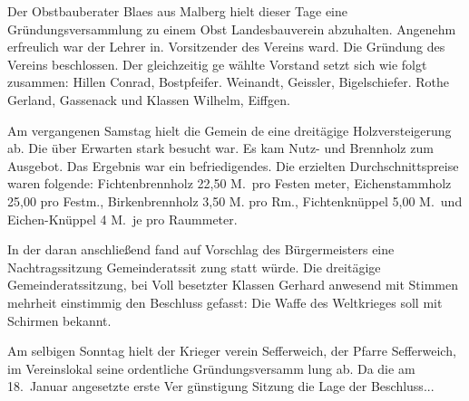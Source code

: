 

\pstart
{}%
Der Obstbauberater Blaes aus Malberg hielt dieser\ob
Tage eine Gründungsversammlung zu einem Obst\ohb
Landesbauverein abzuhalten. Angenehm erfreulich\ob
war der Lehrer\unsicher{} in. Vorsitzender des Vereins ward. Die\ob
Gründung des Vereins beschlossen. Der gleichzeitig ge\ohb
wählte Vorstand setzt sich wie folgt zusammen:\ob
Hillen Conrad, Bostpfeifer. Weinandt, Geissler,\ob
Bigelschiefer. Rothe Gerland, Gassenack und\ob
Klassen Wilhelm, Eiffgen.

%
Am vergangenen Samstag hielt die Gemein\ohb
de eine dreitägige Holzversteigerung ab. Die über\ob
Erwarten stark besucht war. Es kam Nutz- und\ob
Brennholz zum Ausgebot. Das Ergebnis war ein\ob
befriedigendes. Die erzielten Durchschnittspreise\ob
waren folgende: Fichtenbrennholz 22,50 M.\ pro Festen\ohb
meter, Eichenstammholz 25,00 pro Festm., Birkenbrennholz 3,50 M.\ob
pro Rm., Fichtenknüppel 5,00 M.\ und Eichen-Knüppel 4 M.\ je\ob
pro Raummeter.

In der daran anschließend fand auf Vorschlag des\ob
Bürgermeisters eine Nachtragssitzung Gemeinderatssit\ohb
zung statt würde. Die dreitägige Gemeinderatssitzung, bei Voll\ohb
besetzter Klassen Gerhard anwesend mit Stimmen\ohb
mehrheit einstimmig den Beschluss gefasst: Die\ob
Waffe des Weltkrieges soll mit Schirmen bekannt.

Am selbigen Sonntag hielt der Krieger\ohb
verein Sefferweich, der Pfarre Sefferweich, im\ob
Vereinslokal seine ordentliche Gründungsversamm\ohb
lung ab. Da die am 18.\ Januar angesetzte erste Ver\ohb
günstigung Sitzung die Lage der Beschluss\unsicher...
\pend
